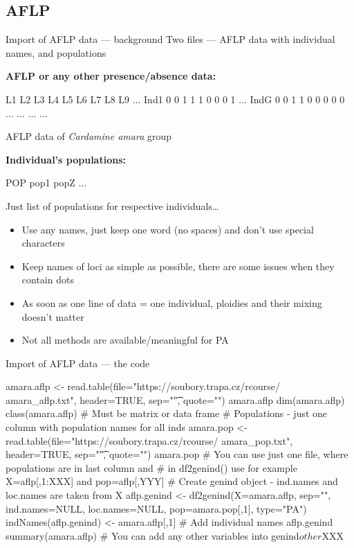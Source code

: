 \documentclass[compress, ucs, xelatex, 11pt, xcolor=svgnames,
	hyperref={
		bookmarks=true,
		unicode=true,
		colorlinks=true,
		pdftitle={Molecular data in R},
		plainpages=false,
		pdfauthor={Vojtech Zeisek},
		pdfsubject={Course about phylogeny and evolution in R},
		pdfcreator={XeLaTeX},
		pdfkeywords={R, evolution, phylogeny, molecular data},
		linkcolor=Tomato,
		anchorcolor=SaddleBrown,
		citecolor=Goldenrod,
		filecolor=DarkMagenta,
		menucolor=Sienna,
		urlcolor=DarkTurquoise,
		pdftex},
	url={hyphens, lowtilde} %
	]{beamer}
\begin{document}
\subsection{AFLP}

\begin{frame}[fragile]{Import of AFLP data --- background}
	Two files --- AFLP data with individual names, and populations
	\vfill
	\begin{multicols}{2}
	\vfill
	\textbf{AFLP or any other presence/absence data:}
	\vfill
	\begin{spluscode}
        L1 L2 L3 L4 L5 L6 L7 L8 L9 ...
    Ind1 0  0  1  1  1  0  0  0  1 ...
    IndG 0  0  1  1  0  0  0  0  0 ...
     ...  ...                      ...
	\end{spluscode}
	\vfill
	\begin{footnotesize}
		AFLP data of \textit{Cardamine amara} group
	\end{footnotesize}
	\vfill
	\textbf{Individual's populations:}
	\vfill
	\begin{spluscode}
    POP
    pop1
    popZ
    ...
	\end{spluscode}
	\vfill
	\begin{footnotesize}
		Just list of populations for respective individuals\ldots
	\end{footnotesize}
	\columnbreak
	\begin{itemize}
		\item Use any names, just keep one word (no spaces) and don't use special characters
		\item Keep names of loci as simple as possible, there are some issues when they contain dots
		\item As soon as one line of data = one individual, ploidies and their mixing doesn't matter
		\item Not all methods are available/meaningful for PA
	\end{itemize}
	\end{multicols}
\end{frame}

\begin{frame}[fragile]{Import of AFLP data --- the code}
	\begin{spluscode}
    amara.aflp <- read.table(file="https://soubory.trapa.cz/rcourse/
      amara_aflp.txt", header=TRUE, sep="\t", quote="")
    amara.aflp
    dim(amara.aflp)
    class(amara.aflp) # Must be matrix or data frame
    # Populations - just one column with population names for all inds
    amara.pop <- read.table(file="https://soubory.trapa.cz/rcourse/
      amara_pop.txt", header=TRUE, sep="\t", quote="")
    amara.pop
    # You can use just one file, where populations are in last column and
    # in df2genind() use for example X=aflp[,1:XXX] and pop=aflp[,YYY]
    # Create genind object - ind.names and loc.names are taken from X
    aflp.genind <- df2genind(X=amara.aflp, sep="", ind.names=NULL,
      loc.names=NULL, pop=amara.pop[,1], type="PA")
    indNames(aflp.genind) <- amara.aflp[,1] # Add individual names
    aflp.genind
    summary(amara.aflp)
    # You can add any other variables into genind$other$XXX
	\end{spluscode}
\end{frame}
\end{document}
